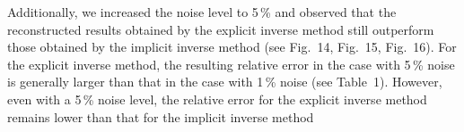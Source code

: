 \documentclass[11pt]{article}
\begin{document}
Additionally, we increased the noise level to 5\,\% and observed
that the reconstructed results obtained by the explicit inverse
method still outperform those obtained by the implicit inverse
method (see Fig.~14, Fig.~15, Fig.~16). For the explicit inverse
method, the resulting relative error in the case with 5\,\% noise
is generally larger than that in the case with 1\,\% noise (see
Table~1). However, even with a 5\,\% noise level, the relative
error for the explicit inverse method remains lower than that for
the implicit inverse method

\end{document}
